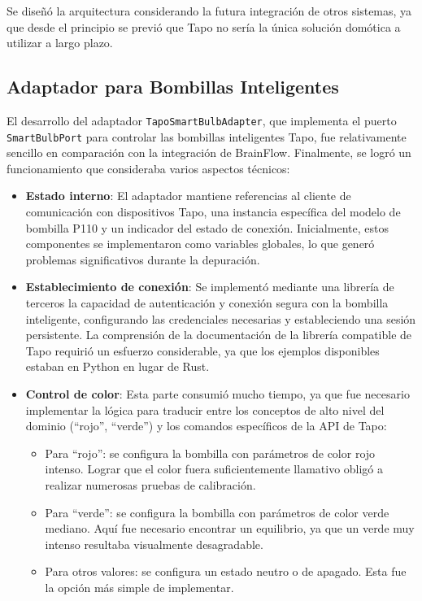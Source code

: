 \begin{enumerate}
Se diseñó la arquitectura considerando la futura integración de otros sistemas, ya que desde el principio se previó que Tapo no sería la única solución domótica a utilizar a largo plazo.

\subsection{Adaptador para Bombillas Inteligentes}

El desarrollo del adaptador \texttt{TapoSmartBulbAdapter}, que implementa el puerto \texttt{SmartBulbPort} para controlar las bombillas inteligentes Tapo, fue relativamente sencillo en comparación con la integración de BrainFlow. Finalmente, se logró un funcionamiento que consideraba varios aspectos técnicos:

\begin{itemize}
    \item \textbf{Estado interno}: El adaptador mantiene referencias al cliente de comunicación con dispositivos Tapo, una instancia específica del modelo de bombilla P110 y un indicador del estado de conexión. Inicialmente, estos componentes se implementaron como variables globales, lo que generó problemas significativos durante la depuración.
    
    \item \textbf{Establecimiento de conexión}: Se implementó mediante una librería de terceros la capacidad de autenticación y conexión segura con la bombilla inteligente, configurando las credenciales necesarias y estableciendo una sesión persistente. La comprensión de la documentación de la librería compatible de Tapo requirió un esfuerzo considerable, ya que los ejemplos disponibles estaban en Python en lugar de Rust.
    
    \item \textbf{Control de color}: Esta parte consumió mucho tiempo, ya que fue necesario implementar la lógica para traducir entre los conceptos de alto nivel del dominio (\textquotedblleft rojo\textquotedblright{}, \textquotedblleft verde\textquotedblright{}) y los comandos específicos de la API de Tapo:
    \begin{itemize}
        \item Para \textquotedblleft rojo\textquotedblright{}: se configura la bombilla con parámetros de color rojo intenso. Lograr que el color fuera suficientemente llamativo obligó a realizar numerosas pruebas de calibración.
        \item Para \textquotedblleft verde\textquotedblright{}: se configura la bombilla con parámetros de color verde mediano. Aquí fue necesario encontrar un equilibrio, ya que un verde muy intenso resultaba visualmente desagradable.
        \item Para otros valores: se configura un estado neutro o de apagado. Esta fue la opción más simple de implementar.
    \end{itemize}
    

\end{itemize}
\end{enumerate}
